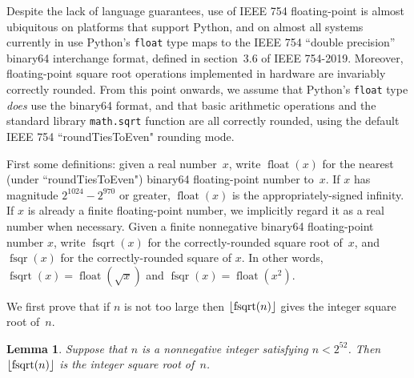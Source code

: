 \documentclass[a4paper]{article}
\DeclarePairedDelimiter\floor{\lfloor}{\rfloor}
\DeclareMathOperator{\fsqrt}{fsqrt}
\DeclareMathOperator{\fsqr}{fsqr}
\DeclareMathOperator{\float}{float}
\theoremstyle{plain}
\newtheorem{lemma}[theorem]{Lemma}
\theoremstyle{definition}
\begin{document}
Despite the lack of language guarantees, use of IEEE 754 floating-point is
almost ubiquitous on platforms that support Python, and on almost all systems
currently in use Python's \lstinline{float} type maps to the IEEE 754 ``double
precision'' binary64 interchange format, defined in section~3.6 of IEEE
754-2019. Moreover, floating-point square root operations implemented in
hardware are invariably correctly rounded. From this point onwards, we assume
that Python's \lstinline{float} type \emph{does} use the binary64 format, and
that basic arithmetic operations and the standard library \lstinline{math.sqrt}
function are all correctly rounded, using the default IEEE 754
``roundTiesToEven" rounding mode.

First some definitions: given a real number~$x$, write $\float(x)$ for the
nearest (under ``roundTiesToEven") binary64 floating-point number to~$x$. If
$x$ has magnitude $2^{1024} - 2^{970}$ or greater, $\float(x)$ is the
appropriately-signed infinity. If $x$ is already a finite floating-point
number, we implicitly regard it as a real number when necessary. Given a finite
nonnegative binary64 floating-point number $x$, write $\fsqrt(x)$ for the
correctly-rounded square root of~$x$, and $\fsqr(x)$ for the correctly-rounded
square of $x$. In other words, $\fsqrt(x) = \float(\sqrt x)$ and $\fsqr(x) =
\float(x^2)$.

We first prove that if $n$ is not too large then $\floor{\fsqrt(n)}$ gives the
integer square root of~$n$.

\begin{lemma}
  Suppose that $n$ is a nonnegative integer satisfying $n < 2^{52}$. Then
  $\floor{\fsqrt(n)}$ is the integer square root of~$n$.
\end{lemma}
\end{document}
